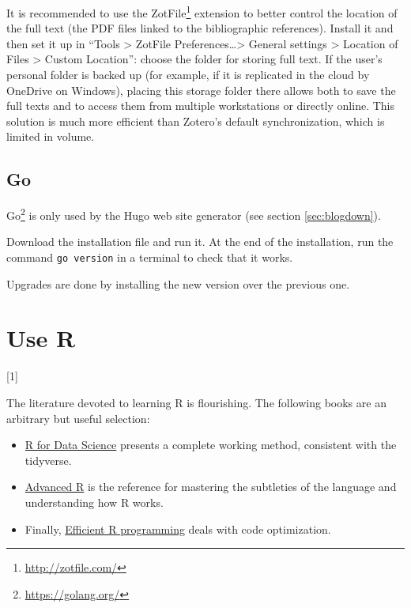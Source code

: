 \documentclass[
  12pt,
  american,
  a4paper,
  extrafontsizes,onecolumn,openright
  ]{memoir}
\providecommand{\tightlist}{%
  \setlength{\itemsep}{0pt}\setlength{\parskip}{0pt}}
\newcommand{\toc}[1]{%
  \startcontents[chapters]%
  \printcontents[chapters]{}{1}[#1]{}%
  ~\newline%
}
\begin{document}
It is recommended to use the ZotFile\footnote{\url{http://zotfile.com/}} extension to better control the location of the full text (the PDF files linked to the bibliographic references).
Install it and then set it up in \enquote{Tools \textgreater{} ZotFile Preferences\ldots\textgreater{} General settings \textgreater{} Location of Files \textgreater{} Custom Location}: choose the folder for storing full text.
If the user's personal folder is backed up (for example, if it is replicated in the cloud by OneDrive on Windows), placing this storage folder there allows both to save the full texts and to access them from multiple workstations or directly online.
This solution is much more efficient than Zotero's default synchronization, which is limited in volume.

\hypertarget{go}{%
\section{Go}\label{go}}

Go\footnote{\url{https://golang.org/}} is only used by the Hugo web site generator (see section \ref{sec:blogdown}).

Download the installation file and run it.
At the end of the installation, run the command \texttt{go\ version} in a terminal to check that it works.

Upgrades are done by installing the new version over the previous one.

\hypertarget{chap-utiliseR}{%
\chapter{Use R}\label{chap-utiliseR}}

\toc{1}

The literature devoted to learning R is flourishing.
The following books are an arbitrary but useful selection:

\begin{itemize}
\tightlist
\item
  \href{https://r4ds.had.co.nz/}{R for Data Science} \autocite{Wickham2016} presents a complete working method, consistent with the tidyverse.
\item
  \href{http://adv-r.had.co.nz/}{Advanced R} \autocite{Wickham2014} is the reference for mastering the subtleties of the language and understanding how R works.
\item
  Finally, \href{https://csgillespie.github.io/efficientR/}{Efficient R programming} \autocite{Gillespie2016} deals with code optimization.
\end{itemize}
\end{document}
